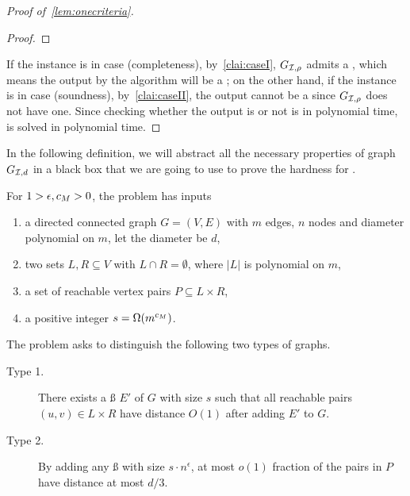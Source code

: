 \begin{proof}[Proof of~\cref{lem:onecriteria}]
\begin{proof}
	\end{proof}
	
	If the \labcov{} instance is in case (completeness), by~\cref{clai:caseI}, $G_{\mathcal{I},\mathcal{\rho}{}}$ admits a , which means the output by the  algorithm will be a ; on the other hand, if the \labcov{} instance is in case (soundness), by~\cref{clai:caseII}, the output cannot be a  since $G_{\mathcal{I},\mathcal{\rho}{}}$ does not have one. Since checking whether the output is  or not is in polynomial time, \labcov{} is solved in polynomial time.
 
\end{proof}






In the following definition, we will abstract all the necessary properties of graph $G_{\mathcal{I},d}$ in a black box that we are going to use to prove the hardness for .

\begin{definition}\label{def:gadget}
	For $1>\epsilon,c_M{}>0$, the \gadget{\cs{}}{\epsilon} problem has inputs
	\begin{enumerate}
		\item a directed connected graph $G=(V,E)$ with $m$ edges, $n$ nodes and diameter polynomial on $m$, let the diameter be $d$,
		\item two sets $L,R\subseteq V$ with $L\cap R=\emptyset$, where $|L|$ is polynomial on $m$,
		\item a set of reachable vertex pairs $P\subseteq L\times R$,
		\item a positive integer $s=\Omega(m^{c_M{}})$.
	\end{enumerate}
	The problem asks to distinguish the following two types of graphs.
	\begin{description}
		\item[Type 1.] There exists a \ss{} $E'$ of $G$ with size $s$ such that all reachable pairs $(u,v)\in L\times R$ have distance $O(1)$ after adding $E'$ to $G$.
		\item[Type 2.] By adding any \ss{} with size $s\cdot n^\epsilon$, at most $o(1)$ fraction of the pairs in $P$ have distance at most $d/3$.
	\end{description}
	
\end{definition}

